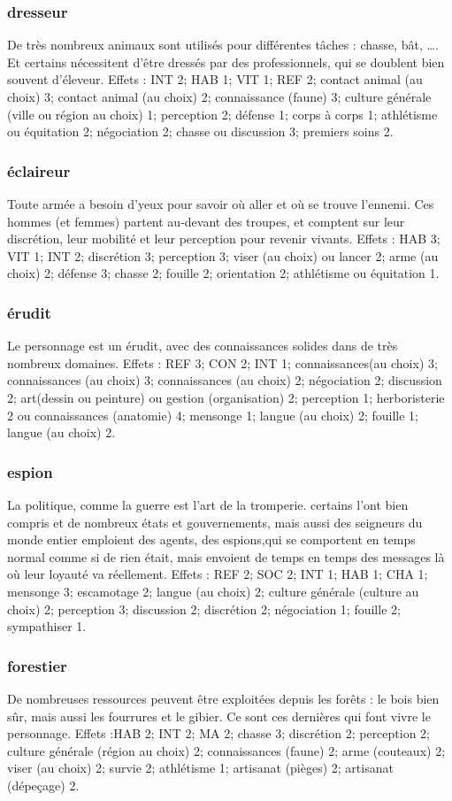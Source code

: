 \documentclass[10pt,a4paper,twocolumn]{book}
\begin{document}
\subsubsection{dresseur}
De très nombreux animaux sont utilisés pour différentes tâches : chasse, bât, …. Et certains nécessitent d’être dressés par des professionnels, qui se doublent bien souvent d’éleveur.
Effets : INT 2; HAB 1; VIT 1; REF 2; contact animal (au choix) 3; contact animal (au choix) 2; connaissance (faune) 3; culture générale (ville ou région au choix) 1; perception 2; défense 1; corps à corps 1; athlétisme ou équitation 2; négociation 2; chasse ou discussion 3; premiers soins 2.
\subsubsection{éclaireur}
Toute armée a besoin d’yeux pour savoir où aller et où se trouve l’ennemi. Ces hommes (et femmes) partent au-devant des troupes, et comptent sur leur discrétion, leur mobilité et leur perception pour revenir vivants.
Effets : HAB 3; VIT 1; INT 2; discrétion 3; perception 3; viser (au choix) ou lancer 2; arme (au choix) 2; défense 3; chasse 2; fouille 2; orientation 2; athlétisme ou équitation 1. 
\subsubsection{érudit}
Le personnage est un érudit, avec des connaissances solides dans de très nombreux domaines.
Effets : REF 3; CON 2; INT 1; connaissances(au choix) 3; connaissances (au choix) 3; connaissances (au choix) 2; négociation 2; discussion 2; art(dessin ou peinture) ou gestion (organisation) 2; perception 1; herboristerie 2 ou connaissances (anatomie) 4; mensonge 1; langue (au choix) 2; fouille 1; langue (au choix) 2.
\subsubsection{espion}
La politique, comme la guerre est l’art de la tromperie. certains l’ont bien compris et de nombreux états et gouvernements, mais aussi des seigneurs du monde entier emploient des agents, des espions,qui se comportent en temps normal comme si de rien était, mais envoient de temps en temps des messages là où leur loyauté va réellement.
Effets : REF 2; SOC 2; INT 1; HAB 1; CHA 1; mensonge 3; escamotage 2; langue (au choix) 2; culture générale (culture au choix) 2; perception 3; discussion 2; discrétion 2; négociation 1; fouille 2; sympathiser 1.
\subsubsection{forestier}
De nombreuses ressources peuvent être exploitées depuis les forêts : le bois bien sûr, mais aussi les fourrures et le gibier. Ce sont ces dernières qui font vivre le personnage.
Effets :HAB 2; INT 2; MA 2; chasse 3; discrétion 2; perception 2; culture générale (région au choix) 2; connaissances (faune) 2; arme (couteaux) 2; viser (au choix) 2; survie 2; athlétisme 1; artisanat (pièges) 2; artisanat (dépeçage) 2.
\end{document}
